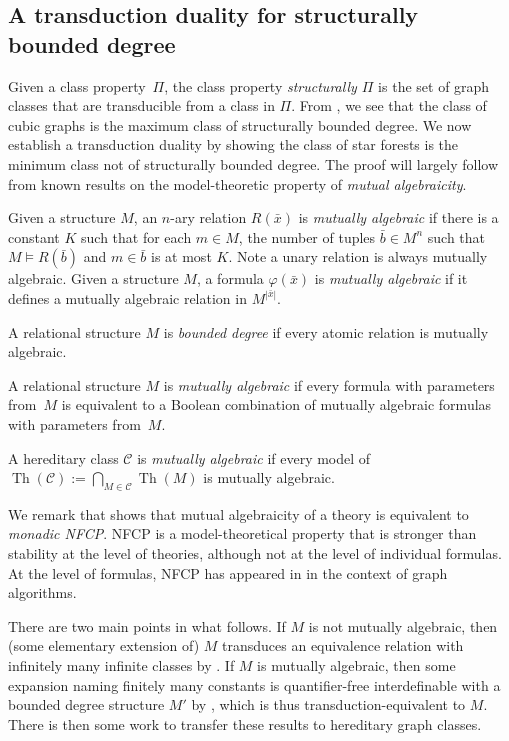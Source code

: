 \documentclass{lmcs}
\newcommand\xbar{\bar{x}}
\newcommand\bbar{\bar{b}}
\newcommand{\Cc}{\mathscr{C}}
\renewcommand{\phi}{\varphi}
\newcommand{\NFCP}{{\rm NFCP}}
\theoremstyle{definition}
\DeclareMathOperator{\Th}{\text{Th}}
\begin{document}
\subsection{A transduction duality for structurally bounded degree}\label{sec:sbddual}
Given a class property~$\Pi$, the class property {\em structurally $\Pi$} is the set of  graph classes that are transducible from a class in $\Pi$. From , we see that the class of cubic graphs is the maximum class of structurally bounded degree. We now establish a transduction duality by showing the class of star forests is the minimum class not of structurally bounded degree. The proof will largely follow from known results on the model-theoretic property of \emph{mutual algebraicity}.

\begin{defi}
	Given a structure $M$, an $n$-ary relation $R(\xbar)$ is {\em mutually algebraic} if there is a constant $K$ such that for each $m \in M$, the number of tuples  $\bbar \in M^n$ such that $M \models R(\bbar)$ and $m \in \bbar$ is at most $K$. Note a unary relation is always mutually algebraic. Given a structure $M$, a formula $\phi(\xbar)$ is {\em mutually algebraic} if it defines a mutually algebraic relation in $M^{|\xbar|}$.
	
	A relational structure $M$ is {\em bounded degree} if every atomic relation is mutually algebraic.
	
	A relational structure $M$ is {\em mutually algebraic} if every formula with parameters from~$M$ is equivalent to a Boolean combination of mutually algebraic formulas with parameters from~$M$.
	
	A hereditary class $\Cc$ is {\em mutually algebraic} if every model of $\Th(\Cc) := \bigcap_{M \in \Cc} \Th(M)$ is mutually algebraic.
\end{defi}

We remark that \cite[Theorem 3.3]{MA} shows that mutual algebraicity of a theory is equivalent to {\em monadic {\NFCP}}. {\NFCP} is a model-theoretical property that is stronger than stability at the level of theories, although not at the level of individual formulas. At the level of formulas, {\NFCP} has appeared in \cite{DomInd} in the context of graph algorithms.

There are two main points in what follows. If $M$ is not mutually algebraic, then (some elementary extension of) $M$ transduces an equivalence relation with infinitely many infinite classes by \cite[Theorem 3.2]{Worst}. If $M$ is mutually algebraic, then some expansion naming finitely many constants is quantifier-free interdefinable with a bounded degree structure $M'$ by \cite[Lemma 4.3]{LT2}, which is thus transduction-equivalent to $M$. There is then some work to transfer these results to hereditary graph classes.
\end{document}
